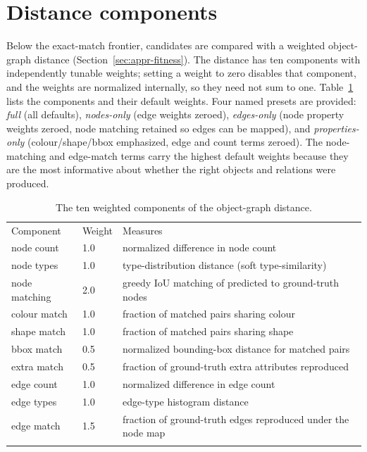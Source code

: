 \section{Distance components}
\label{app:distanceconfig}

Below the exact-match frontier, candidates are compared with a weighted object-graph
distance (Section~\ref{sec:appr-fitness}). The distance has ten components with
independently tunable weights; setting a weight to zero disables that component, and the
weights are normalized internally, so they need not sum to one. Table~\ref{tab:app-dist}
lists the components and their default weights. Four named presets are provided: \emph{full}
(all defaults), \emph{nodes-only} (edge weights zeroed), \emph{edges-only} (node property
weights zeroed, node matching retained so edges can be mapped), and \emph{properties-only}
(colour/shape/bbox emphasized, edge and count terms zeroed). The node-matching and
edge-match terms carry the highest default weights because they are the most informative
about whether the right objects and relations were produced.

\begin{table}[htbp]
\centering
\caption{The ten weighted components of the object-graph distance.}
\label{tab:app-dist}
\small
\begin{tabular}{p{3.6cm}p{1.6cm}p{7.4cm}}
\hline\noalign{\smallskip}
Component & Weight & Measures \\
\noalign{\smallskip}\hline\noalign{\smallskip}
node count & 1.0 & normalized difference in node count \\
node types & 1.0 & type-distribution distance (soft type-similarity) \\
node matching & 2.0 & greedy IoU matching of predicted to ground-truth nodes \\
colour match & 1.0 & fraction of matched pairs sharing colour \\
shape match & 1.0 & fraction of matched pairs sharing shape \\
bbox match & 0.5 & normalized bounding-box distance for matched pairs \\
extra match & 0.5 & fraction of ground-truth extra attributes reproduced \\
edge count & 1.0 & normalized difference in edge count \\
edge types & 1.0 & edge-type histogram distance \\
edge match & 1.5 & fraction of ground-truth edges reproduced under the node map \\
\noalign{\smallskip}\hline
\end{tabular}
\end{table}

